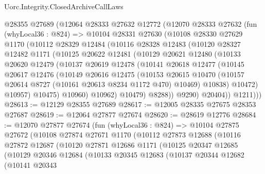 \begin{lexlean}{Uorc.Integrity.ClosedArchiveCallLaws}
\begin{coremodule}
    @28355
    @27689
    (@12064
      @28333
      @27632
      @12772
      (@12070
        @28333
        @27632
        (fun (whyLocal36 : @824) =>
        @10104
          @28331
          @27630
          (@10108
            @28330
            @27629
            @1170
            (@10112
              @28329
              @12484
              (@10116
                @28328
                @12483
                (@10120
                  @28327
                  @12482
                  @1171
                  (@10125
                    @20622
                    @12481
                    (@10129
                      @20621
                      @12480
                      (@10133
                        @20620
                        @12479
                        (@10137
                          @20619
                          @12478
                          (@10141
                            @20618
                            @12477
                            (@10145
                              @20617
                              @12476
                              (@10149
                                @20616
                                @12475
                                (@10153
                                  @20615
                                  @10470
                                  (@10157 @20614 @8727 (@10161 @20613 @8234 @1172 @470) @10469)
                                  @10838)
                                @10472)
                              @10957)
                            @10475)
                          @10960)
                        @10962)
                      @10479)
                    @8288))
                @9290)
              @20404))
          @1211)))
@28613 := @12129 @28355 @27689
@28617 := @12005 @28335 @27675 @28353 @27687
@28619 := @12064 @27877 @27674
@28620 := @28619 @12776
@28684 := @12070
    @27877
    @27674
    (fun (whyLocal36 : @824) =>
    @10104
      @27875
      @27672
      (@10108
        @27874
        @27671
        @1170
        (@10112
          @27873
          @12688
          (@10116
            @27872
            @12687
            (@10120
              @27871
              @12686
              @1171
              (@10125
                @20347
                @12685
                (@10129
                  @20346
                  @12684
                  (@10133
                    @20345
                    @12683
                    (@10137
                      @20344
                      @12682
                      (@10141
                        @20343

\end{coremodule}
\end{lexlean}
